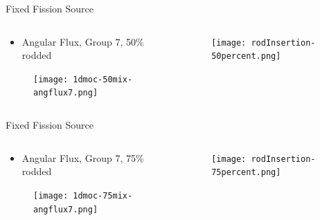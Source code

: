 
\begin{frame}[t]{Fixed Fission Source}

\begin{columns}
    \begin{column}{0.6\textwidth}
        \begin{itemize}
            \item Angular Flux, Group 7, 50\% rodded
        \end{itemize}
        \begin{figure}[H]
            \centering
            \texttt{[image: 1dmoc-50mix-angflux7.png]}
        \end{figure}
    \end{column}
    \begin{column}{0.4\textwidth}
        \begin{figure}[H]
            \centering
            \texttt{[image: rodInsertion-50percent.png]}
        \end{figure}
    \end{column}
\end{columns}

\end{frame}


\begin{frame}[t]{Fixed Fission Source}

\begin{columns}
    \begin{column}{0.6\textwidth}
        \begin{itemize}
            \item Angular Flux, Group 7, 75\% rodded
        \end{itemize}
        \begin{figure}[H]
            \centering
            \texttt{[image: 1dmoc-75mix-angflux7.png]}
        \end{figure}
    \end{column}
    \begin{column}{0.4\textwidth}
        \begin{figure}[H]
            \centering
            \texttt{[image: rodInsertion-75percent.png]}
        \end{figure}
    \end{column}
\end{columns}

\end{frame}

